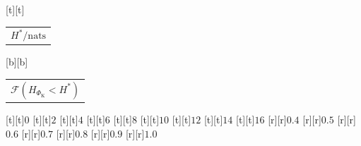 %    
%
%
\begin{psfrags}%
\psfragscanon%
%
[t][t]{\color[rgb]{0,0,0}\setlength{\tabcolsep}{0pt}\begin{tabular}{c}{\Large$H^\ast/\mathrm{nats}$}\end{tabular}}%
[b][b]{\color[rgb]{0,0,0}\setlength{\tabcolsep}{0pt}\begin{tabular}{c}{\Large$\mathcal{F}(H_{\Phi_\mathrm{K}} < H^\ast)$}\end{tabular}}%
%
[t][t]{$0$}%
[t][t]{$2$}%
[t][t]{$4$}%
[t][t]{$6$}%
[t][t]{$8$}%
[t][t]{$10$}%
[t][t]{$12$}%
[t][t]{$14$}%
[t][t]{$16$}%
%
[r][r]{$0.4$}%
[r][r]{$0.5$}%
[r][r]{$0.6$}%
[r][r]{$0.7$}%
[r][r]{$0.8$}%
[r][r]{$0.9$}%
[r][r]{$1.0$}%
%
%
\end{psfrags}%
%
